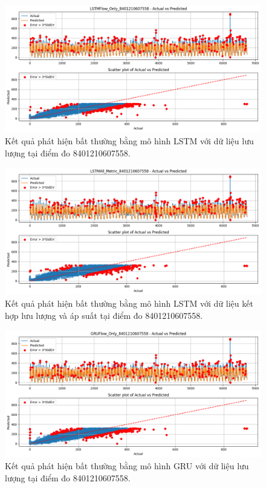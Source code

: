\begin{figure}[htbp]
    \centering
    \includegraphics[width=\textwidth]{image/section6_3/anomaly_detection_8401210607558_lstm_flow.png}
    \caption{Kết quả phát hiện bất thường bằng mô hình LSTM với dữ liệu lưu lượng tại điểm đo 8401210607558.}
    \label{fig:anomaly_lstm_8401210607558_flow}
\end{figure}

\begin{figure}[htbp]
    \centering
    \includegraphics[width=\textwidth]{image/section6_3/anomaly_detection_8401210607558_lstm_all_metric.png}
    \caption{Kết quả phát hiện bất thường bằng mô hình LSTM với dữ liệu kết hợp lưu lượng và áp suất tại điểm đo 8401210607558.}
    \label{fig:anomaly_lstm_8401210607558_all}
\end{figure}

\begin{figure}[htbp]
    \centering
    \includegraphics[width=\textwidth]{image/section6_3/anomaly_detection_8401210607558_gru_flow.png}
    \caption{Kết quả phát hiện bất thường bằng mô hình GRU với dữ liệu lưu lượng tại điểm đo 8401210607558.}
    \label{fig:anomaly_gru_8401210607558_flow}
\end{figure}

